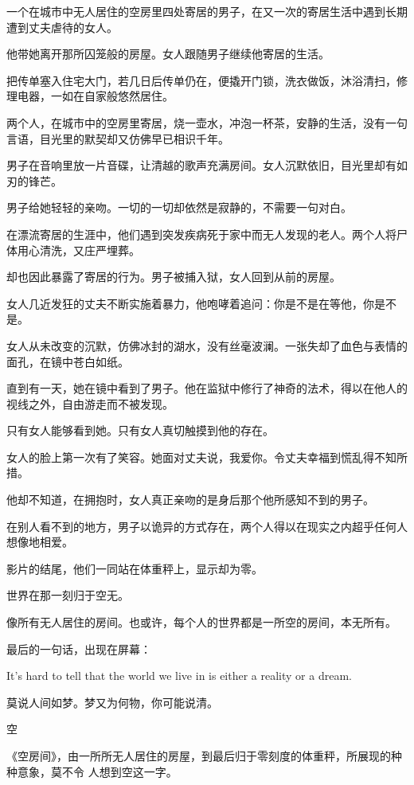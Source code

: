 \documentclass[12pt,a4paper]{article}
\newcommand{\subpart}[1]{
	\begingroup \par
	\vspace{1ex} \centering #1
	\par \endgroup
}
\begin{document}
		一个在城市中无人居住的空房里四处寄居的男子，在又一次的寄居生活中遇到长期遭到丈夫虐待的女人。\par
		他带她离开那所囚笼般的房屋。女人跟随男子继续他寄居的生活。\par
		把传单塞入住宅大门，若几日后传单仍在，便撬开门锁，洗衣做饭，沐浴清扫，修理电器，一如在自家般悠然居住。\par
		两个人，在城市中的空房里寄居，烧一壶水，冲泡一杯茶，安静的生活，没有一句言语，目光里的默契却又仿佛早已相识千年。\par
		男子在音响里放一片音碟，让清越的歌声充满房间。女人沉默依旧，目光里却有如刃的锋芒。\par
		男子给她轻轻的亲吻。一切的一切却依然是寂静的，不需要一句对白。\par
		在漂流寄居的生涯中，他们遇到突发疾病死于家中而无人发现的老人。两个人将尸体用心清洗，又庄严埋葬。\par
		却也因此暴露了寄居的行为。男子被捕入狱，女人回到从前的房屋。\par
		女人几近发狂的丈夫不断实施着暴力，他咆哮着追问：你是不是在等他，你是不是。\par
		女人从未改变的沉默，仿佛冰封的湖水，没有丝毫波澜。一张失却了血色与表情的面孔，在镜中苍白如纸。\par
		直到有一天，她在镜中看到了男子。他在监狱中修行了神奇的法术，得以在他人的视线之外，自由游走而不被发现。\par
		只有女人能够看到她。只有女人真切触摸到他的存在。\par
		女人的脸上第一次有了笑容。她面对丈夫说，我爱你。令丈夫幸福到慌乱得不知所措。\par
		他却不知道，在拥抱时，女人真正亲吻的是身后那个他所感知不到的男子。\par
		在别人看不到的地方，男子以诡异的方式存在，两个人得以在现实之内超乎任何人想像地相爱。\par
		影片的结尾，他们一同站在体重秤上，显示却为零。\par
		世界在那一刻归于空无。\par
		像所有无人居住的房间。也或许，每个人的世界都是一所空的房间，本无所有。\par
		最后的一句话，出现在屏幕：\par
		It's hard to tell that the world we live in is either a reality or a dream.

		莫说人间如梦。梦又为何物，你可能说清。


		\subpart{空}

		《空房间》，由一所所无人居住的房屋，到最后归于零刻度的体重秤，所展现的种种意象，莫不令
	人想到空这一字。
\end{document}
